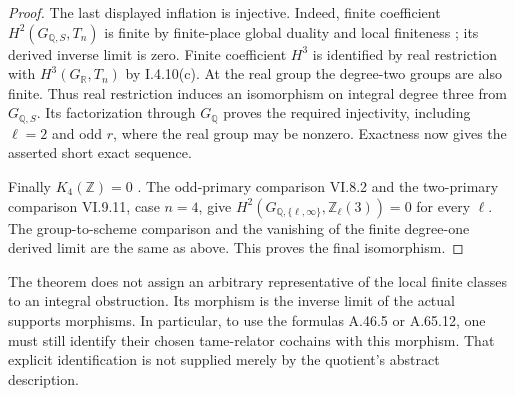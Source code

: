 \begin{proof}
The last displayed inflation is injective. Indeed,
finite coefficient \(H^2(G_{\mathbb Q,S},T_n)\) is finite
by finite-place global duality and local finiteness
\cite[I.2.1, I.4.10]{GhostMilneADT}; its derived inverse
limit is zero. Finite coefficient \(H^3\) is identified
by real restriction with \(H^3(G_{\mathbb R},T_n)\)
by I.4.10(c). At the real group the degree-two groups
are also finite. Thus real restriction induces an
isomorphism on integral degree three from
\(G_{\mathbb Q,S}\). Its factorization through
\(G_{\mathbb Q}\) proves the required injectivity,
including \(\ell=2\) and odd \(r\), where the real
group may be nonzero. Exactness now gives the asserted
short exact sequence.

Finally \(K_4(\mathbb Z)=0\)
\cite[VI.10.1.1]{GhostWeibelKbook}. The odd-primary
comparison VI.8.2 and the two-primary comparison
VI.9.11, case \(n=4\), give
\(H^2(G_{\mathbb Q,\{\ell,\infty\}},\mathbb Z_\ell(3))=0\)
for every \(\ell\). The group-to-scheme comparison and
the vanishing of the finite degree-one derived limit are
the same as above. This proves the final isomorphism.
\end{proof}

The theorem does not assign an arbitrary representative
of the local finite classes to an integral obstruction.
Its morphism is the inverse limit of the actual supports
morphisms. In particular, to use the formulas A.46.5 or
A.65.12, one must still identify their chosen tame-relator
cochains with this morphism. That explicit identification
is not supplied merely by the quotient's abstract
description.
